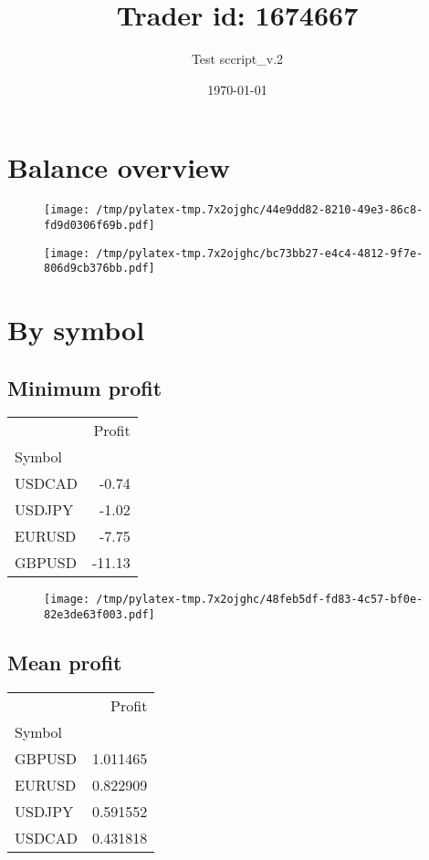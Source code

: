 \documentclass{article}%
\title{Trader id: 1674667}%
\author{Test sccript\_v.2}%
\date{\today}%
\begin{document}
%
\normalsize%
\maketitle%
\section{Balance overview}%
\label{sec:Balanceoverview}%


\begin{figure}[htbp]%
\centering%
\texttt{[image: /tmp/pylatex-tmp.7x2ojghc/44e9dd82-8210-49e3-86c8-fd9d0306f69b.pdf]}%
\end{figure}

%


\begin{figure}[htbp]%
\centering%
\texttt{[image: /tmp/pylatex-tmp.7x2ojghc/bc73bb27-e4c4-4812-9f7e-806d9cb376bb.pdf]}%
\end{figure}

%
\section{By symbol}%
\label{sec:Bysymbol}%
\subsection{Minimum profit }%
\label{subsec:Minimumprofit}%
\begin{tabular}{lr}
\toprule
{} &  Profit \\
Symbol &         \\
\midrule
USDCAD &   -0.74 \\
USDJPY &   -1.02 \\
EURUSD &   -7.75 \\
GBPUSD &  -11.13 \\
\bottomrule
\end{tabular}
%


\begin{figure}[htbp]%
\centering%
\texttt{[image: /tmp/pylatex-tmp.7x2ojghc/48feb5df-fd83-4c57-bf0e-82e3de63f003.pdf]}%
\end{figure}

%
\newpage %
\subsection{Mean profit }%
\label{subsec:Meanprofit}%
\begin{tabular}{lr}
\toprule
{} &    Profit \\
Symbol &           \\
\midrule
GBPUSD &  1.011465 \\
EURUSD &  0.822909 \\
USDJPY &  0.591552 \\
USDCAD &  0.431818 \\
\bottomrule
\end{tabular}
%
\end{document}
